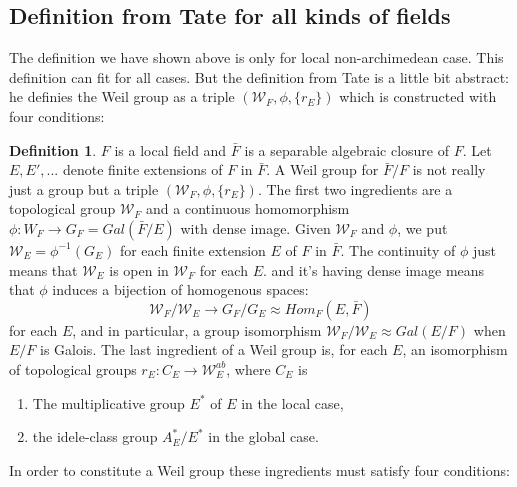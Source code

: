 \documentclass[12pt,a4paper,english]{article}
\theoremstyle{definition}
\newtheorem{defi}{Definition}[section]
\theoremstyle{plain}
\begin{document}
\subsection{Definition from Tate for all kinds of fields}
The definition we have shown above is only for local non-archimedean case. This definition can fit for all cases. 
But the definition from Tate is a little bit abstract: he definies the Weil group as a triple $(\mathcal{W}_{F},\phi,\{r_{E}\})$ which is constructed with four conditions:
\begin{defi}
$F$ is a local field and $\bar{F}$ is a separable algebraic closure of $F$. Let $E, E',...$ denote finite extensions of $F$ in $\bar{F}$. A Weil group for $\bar{F}/F$ is not really just a group but a triple $(\mathcal{W}_{F},\phi,\{r_{E}\})$. The first two ingredients are a topological group $\mathcal{W}_{F}$ and a continuous homomorphism $\phi: W_{F}\rightarrow G_{F}=Gal(\bar{F}/E)$ with dense image. Given $\mathcal{W}_{F}$ and $\phi$, we put $\mathcal{W}_{E}=\phi^{-1}(G_{E})$ for each finite extension $E$ of $F$ in $\bar{F}$. The continuity of $\phi$ just means that $\mathcal{W}_{E}$ is open in $\mathcal{W}_{F}$ for each $E$. and it's having dense image means that $\phi$ induces a bijection of homogenous spaces:
\begin{equation*}
    \mathcal{W}_{F}/\mathcal{W}_{E}\rightarrow G_{F}/G_{E}\approx Hom_{F}(E,\bar{F})
\end{equation*}
for each $E$, and in particular, a group isomorphism $\mathcal{W}_{F}/\mathcal{W}_{E}\approx Gal(E/F)$ when $E/F$ is Galois. The last ingredient of a Weil group is, for each $E$, an isomorphism of topological groups $r_{E}:C_{E}\rightarrow \mathcal{W}^{ab}_{E}$, where
$C_{E}$ is 
\begin{enumerate}
    \item The multiplicative group $E^{*}$ of $E$ in the local case,
    \item the idele-class group $A^{*}_{E}/E^{*}$ in the global case.
\end{enumerate}
\end{defi}
In order to constitute a Weil group these ingredients must satisfy four conditions:
\end{document}
